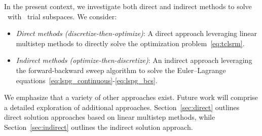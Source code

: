 In the present context, we investigate both direct and indirect methods to solve \methodAcronym\ with \spatialAcronym\ trial
subspaces. We consider: 
\begin{itemize} \item \textit{Direct methods (discretize-then-optimize)}: A direct approach leveraging linear multistep methods to directly solve the optimization problem~\eqref{eq:tclsrm}.
\item \textit{Indirect methods (optimize-then-discretize)}: An indirect approach leveraging the forward-backward sweep algorithm to solve the Euler--Lagrange equations~\eqref{eq:lspg_continuous}-\eqref{eq:lspg_bcs}.

\end{itemize} 
We emphasize that a variety of other approaches exist. Future work will comprise a detailed exploration
of additional approaches.
Section~\ref{sec:direct}  outlines direct solution approaches based on linear
multistep methods, while Section~\ref{sec:indirect} outlines the indirect
solution approach. 





